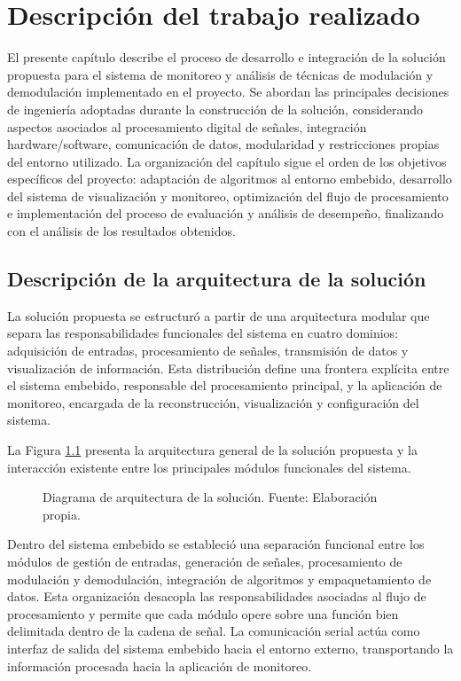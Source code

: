 \chapter{Descripción del trabajo realizado}

El presente capítulo describe el proceso de desarrollo e integración de la solución propuesta para el sistema de monitoreo y análisis de técnicas de modulación y demodulación implementado en el proyecto. Se abordan las principales decisiones de ingeniería adoptadas durante la construcción de la solución, considerando aspectos asociados al procesamiento digital de señales, integración hardware/software, comunicación de datos, modularidad y restricciones propias del entorno utilizado. La organización del capítulo sigue el orden de los objetivos específicos del proyecto: adaptación de algoritmos al entorno embebido, desarrollo del sistema de visualización y monitoreo, optimización del flujo de procesamiento e implementación del proceso de evaluación y análisis de desempeño, finalizando con el análisis de los resultados obtenidos.

\section{Descripción de la arquitectura de la solución}

La solución propuesta se estructuró a partir de una arquitectura modular que separa las responsabilidades funcionales del sistema en cuatro dominios: adquisición de entradas, procesamiento de señales, transmisión de datos y visualización de información. Esta distribución define una frontera explícita entre el sistema embebido, responsable del procesamiento principal, y la aplicación de monitoreo, encargada de la reconstrucción, visualización y configuración del sistema.

La Figura \ref{fig:arquitectura} presenta la arquitectura general de la solución propuesta y la interacción existente entre los principales módulos funcionales del sistema.

\begin{figure}[H]
\centering
\resizebox{\textwidth}{!}{
    \shorthandoff{<>}
    
    \shorthandon{<>}
}
\caption{Diagrama de arquitectura de la solución. Fuente: Elaboración propia.}
\label{fig:arquitectura}
\end{figure}

Dentro del sistema embebido se estableció una separación funcional entre los módulos de gestión de entradas, generación de señales, procesamiento de modulación y demodulación, integración de algoritmos y empaquetamiento de datos. Esta organización desacopla las responsabilidades asociadas al flujo de procesamiento y permite que cada módulo opere sobre una función bien delimitada dentro de la cadena de señal. La comunicación serial actúa como interfaz de salida del sistema embebido hacia el entorno externo, transportando la información procesada hacia la aplicación de monitoreo.

